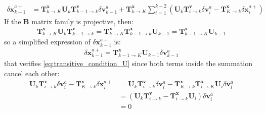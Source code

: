 \documentclass[12pt]{scrartcl}
\begin{document}
\begin{align}
\delta \mathbf{x}^{a+}_{k-1} & = \mathbf{T}^\mathbf{x}_{k \rightarrow K} \mathbf{U}_k \mathbf{T}^\mathbf{v}_{k-1 \rightarrow k} \delta \mathbf{v}^a_{k-1} + \mathbf{T}^\mathbf{x}_{k \rightarrow K} \sum_{i=1}^{k-2} \left(\mathbf{U}_k \mathbf{T}^\mathbf{v}_{i \rightarrow k} \delta \mathbf{v}^a_i - \mathbf{T}^\mathbf{x}_{K \rightarrow k} \delta \mathbf{x}^{a+}_i\right)
\end{align}
If the $\mathbf{B}$ matrix family is projective, then:
\begin{align}
\mathbf{T}^\mathbf{x}_{k \rightarrow K} \mathbf{U}_k \mathbf{T}^\mathbf{v}_{k-1 \rightarrow k} = \mathbf{T}^\mathbf{x}_{k \rightarrow K} \mathbf{T}^\mathbf{x}_{k-1 \rightarrow k} \mathbf{U}_{k-1} = \mathbf{T}^\mathbf{x}_{k-1 \rightarrow K} \mathbf{U}_{k-1}
\end{align}
so a simplified expression of $\delta \mathbf{x}^{a+}_{k-1}$ is:
\begin{align}
\label{eq:projective_condition_U}
\delta \mathbf{x}^{a+}_{k-1} = \mathbf{T}^\mathbf{x}_{k-1 \rightarrow K} \mathbf{U}_{k-1} \delta \mathbf{v}^a_{k-1}
\end{align}
that verifies \eqref{eq:transitive_condition_U} since both terms inside the summation cancel each other:
\begin{align}
\mathbf{U}_k \mathbf{T}^\mathbf{v}_{i \rightarrow k} \delta \mathbf{v}^a_i - \mathbf{T}^\mathbf{x}_{K \rightarrow k} \delta \mathbf{x}^{a+}_i & = \mathbf{U}_k \mathbf{T}^\mathbf{v}_{i \rightarrow k} \delta \mathbf{v}^a_i - \mathbf{T}^\mathbf{x}_{K \rightarrow k} \mathbf{T}^\mathbf{x}_{i \rightarrow K} \mathbf{U}_i \delta \mathbf{v}^a_i \nonumber \\
& = \left(\mathbf{U}_k \mathbf{T}^\mathbf{v}_{i \rightarrow k} - \mathbf{T}^\mathbf{x}_{i \rightarrow k} \mathbf{U}_i \right) \delta \mathbf{v}^a_i \nonumber \\
& = 0
\end{align}
\end{document}
